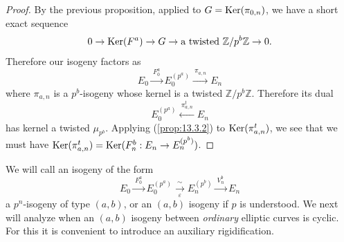 \begin{proof}
By the previous proposition, applied to $G = \operatorname{Ker}(\pi_{0,n})$, we have a short exact sequence
\[
0 \to \operatorname{Ker}(F^a) \to G \to \text{a twisted } \mathbb{Z}/p^b\mathbb{Z} \to 0 .
\]
Therefore our isogeny factors as
\[
E_0 \xrightarrow{\ F_0^a\ } E_0^{(p^a)} \xrightarrow{\ \pi_{a,n}\ } E_n
\]
where $\pi_{a,n}$ is a $p^b$-isogeny whose kernel is a twisted $\mathbb{Z}/p^b\mathbb{Z}$. Therefore its dual
\[
E_0^{(p^a)} \xleftarrow{\ \pi^t_{a,n}\ } E_n
\]
has kernel a twisted $\mu_{p^b}$. Applying (\ref{prop:13.3.2}) to $\operatorname{Ker}(\pi^t_{a,n})$, we see that we must have $\operatorname{Ker}(\pi^t_{a,n}) = \operatorname{Ker}(F^b_n : E_n \to E_n^{(p^b)})$.
\end{proof}

\kmitem\label{item:13.3.4}
We will call an isogeny of the form
\[
E_0 \xrightarrow{\ F_0^a\ } E_0^{(p^a)} \xrightarrow[\varepsilon]{\ \sim\ } E_n^{(p^b)} \xrightarrow{\ V_n^b\ } E_n
\]
a $p^n$-isogeny of type $(a, b)$, or an $(a,b)$ isogeny if $p$ is understood. We next will analyze when an $(a,b)$ isogeny between \emph{ordinary} elliptic curves is cyclic. For this it is convenient to introduce an auxiliary rigidification.

